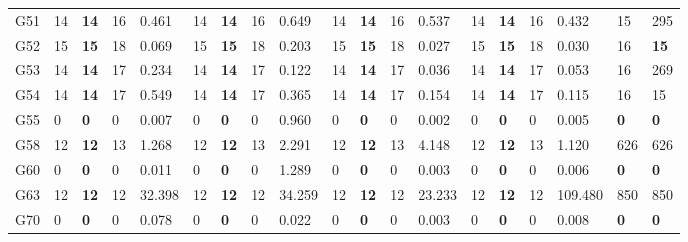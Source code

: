 \documentclass[12pt, a4paper]{article}%
\numberwithin{equation}{section}
\theoremstyle{plain}
\begin{document}
{\begin{landscape}
\begin{longtable}{lllllllllllllllllll}
						G51                       & 14   & \textbf{14} & 16  & 0.461  & 14   & \textbf{14} & 16  & 0.649  & 14   & \textbf{14} & 16  & 0.537  & 14   & \textbf{14} & 16  & 0.432   & 15                      & 295                  \\
						G52                       & 15   & \textbf{15} & 18  & 0.069  & 15   & \textbf{15} & 18  & 0.203  & 15   & \textbf{15} & 18  & 0.027  & 15   & \textbf{15} & 18  & 0.030   & 16                      & \textbf{15}          \\
						G53                       & 14   & \textbf{14} & 17  & 0.234  & 14   & \textbf{14} & 17  & 0.122  & 14   & \textbf{14} & 17  & 0.036  & 14   & \textbf{14} & 17  & 0.053   & 16                      & 269                  \\
						G54                       & 14   & \textbf{14} & 17  & 0.549  & 14   & \textbf{14} & 17  & 0.365  & 14   & \textbf{14} & 17  & 0.154  & 14   & \textbf{14} & 17  & 0.115   & 16                      & 15                   \\
						G55                       & 0    & \textbf{0}  & 0   & 0.007  & 0    & \textbf{0}  & 0   & 0.960  & 0    & \textbf{0}  & 0   & 0.002  & 0    & \textbf{0}  & 0   & 0.005   & \textbf{0}              & \textbf{0}           \\
						G58                       & 12   & \textbf{12} & 13  & 1.268  & 12   & \textbf{12} & 13  & 2.291  & 12   & \textbf{12} & 13  & 4.148  & 12   & \textbf{12} & 13  & 1.120   & 626                     & 626                  \\
						G60                       & 0    & \textbf{0}  & 0   & 0.011  & 0    & \textbf{0}  & 0   & 1.289  & 0    & \textbf{0}  & 0   & 0.003  & 0    & \textbf{0}  & 0   & 0.006   & \textbf{0}              & \textbf{0}           \\
						G63                       & 12   & \textbf{12} & 12  & 32.398 & 12   & \textbf{12} & 12  & 34.259 & 12   & \textbf{12} & 12  & 23.233 & 12   & \textbf{12} & 12  & 109.480 & 850                     & 850                  \\
						G70                       & 0    & \textbf{0}  & 0   & 0.078  & 0    & \textbf{0}  & 0   & 0.022  & 0    & \textbf{0}  & 0   & 0.003  & 0    & \textbf{0}  & 0   & 0.008   & \textbf{0}              & \textbf{0}                           \\ \hline
					\end{longtable}
				\end{landscape}
			}
			
\end{document}
